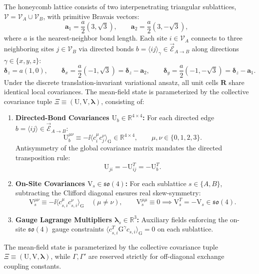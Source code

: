 The honeycomb lattice consists of two interpenetrating triangular sublattices, $\mathcal{V} = \mathcal{V}_A \cup \mathcal{V}_B$, with primitive Bravais vectors:
\begin{equation}
\label{eq:m1_2_primitive_vectors}
\mathbf{a}_1 = \frac{a}{2}(3, \sqrt{3}), \qquad \mathbf{a}_2 = \frac{a}{2}(3, -\sqrt{3}),
\end{equation}
where $a$ is the nearest-neighbor bond length. Each site $i \in \mathcal{V}_A$ connects to three neighboring sites $j \in \mathcal{V}_B$ via directed bonds $b = \langle ij \rangle_\gamma \in \overrightarrow{\mathcal{E}}_{A \to B}$ along directions $\gamma \in \{x, y, z\}$:
\begin{equation}
\label{eq:m1_2_bond_vectors}
\bm{\delta}_z = a(1, 0), \qquad \bm{\delta}_x = \frac{a}{2}(-1, \sqrt{3}) = \bm{\delta}_z - \mathbf{a}_2, \qquad \bm{\delta}_y = \frac{a}{2}(-1, -\sqrt{3}) = \bm{\delta}_z - \mathbf{a}_1.
\end{equation}
Under the discrete translation-invariant variational ansatz, all unit cells $\mathbf{R}$ share identical local covariances. The mean-field state is parameterized by the collective covariance tuple $\Xi \equiv (\mathrm{U}, \mathrm{V}, \boldsymbol{\lambda})$, consisting of:
\begin{enumerate}
\item \textbf{Directed-Bond Covariances $\mathrm{U}_b \in \mathbb{R}^{4 \times 4}$:} For each directed edge $b = \langle ij \rangle \in \overrightarrow{\mathcal{E}}_{A \to B}$:
\begin{equation}
\label{eq:m1_2_bond_cov_def}
\mathrm{U}_b^{\mu\nu} \equiv -\ii \langle c_i^\mu c_j^\nu \rangle_{\mathrm{G}} \in \mathbb{R}^{4 \times 4}, \qquad \mu, \nu \in \{0, 1, 2, 3\}.
\end{equation}
Antisymmetry of the global covariance matrix mandates the directed transposition rule:
\begin{equation}
\label{eq:m1_2_bond_transposition}
\mathrm{U}_{ji} = -\mathrm{U}_{ij}^T = -\mathrm{U}_b^T.
\end{equation}
\item \textbf{On-Site Covariances $\mathrm{V}_s \in \mathfrak{so}(4)$:} For each sublattice $s \in \{A, B\}$, subtracting the Clifford diagonal ensures real skew-symmetry:
\begin{equation}
\label{eq:m1_2_site_cov_def}
\mathrm{V}_s^{\mu\nu} \equiv -\ii \langle c_{s, i}^\mu c_{s, i}^\nu \rangle_{\mathrm{G}} \quad (\mu \neq \nu), \qquad \mathrm{V}_s^{\mu\mu} \equiv 0 \implies \mathrm{V}_s^T = -\mathrm{V}_s \in \mathfrak{so}(4).
\end{equation}
\item \textbf{Gauge Lagrange Multipliers $\boldsymbol{\lambda}_s \in \mathbb{R}^3$:} Auxiliary fields enforcing the on-site $\mathfrak{so}(4)$ gauge constraints $\langle c_{s, i}^T \mathrm{G}^\gamma c_{s, i} \rangle_{\mathrm{G}} = 0$ on each sublattice.
\end{enumerate}
The mean-field state is parameterized by the collective covariance tuple $\Xi \equiv (\mathrm{U}, \mathrm{V}, \boldsymbol{\lambda})$, while $\Gamma, \Gamma'$ are reserved strictly for off-diagonal exchange coupling constants.

